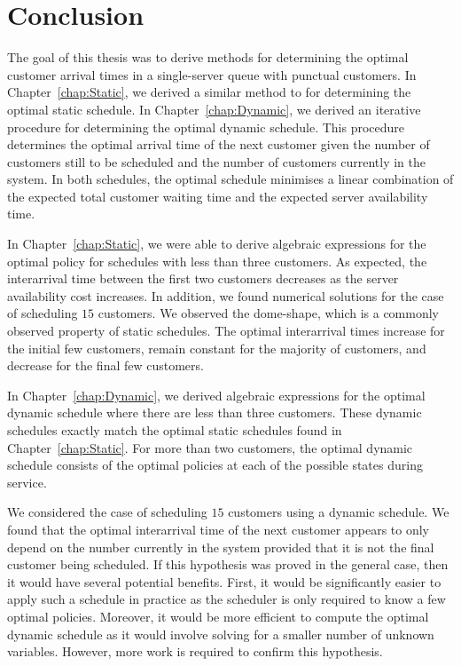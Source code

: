 \chapter{Conclusion}
The goal of this thesis was to derive methods for determining the optimal customer arrival times in a single-server queue with punctual customers. In Chapter~\ref{chap:Static}, we derived a similar method to \citet{Pegden} for determining the optimal static schedule. In Chapter~\ref{chap:Dynamic}, we derived an iterative procedure for determining the optimal dynamic schedule. This procedure determines the optimal arrival time of the next customer given the number of customers still to be scheduled and the number of customers currently in the system. In both schedules, the optimal schedule minimises a linear combination of the expected total customer waiting time and the expected server availability time.

In Chapter~\ref{chap:Static}, we were able to derive algebraic expressions for the optimal policy for schedules with less than three customers. As expected, the interarrival time between the first two customers decreases as the server availability cost increases. In addition, we found numerical solutions for the case of scheduling $15$ customers. We observed the dome-shape, which is a commonly observed property of static schedules. The optimal interarrival times increase for the initial few customers, remain constant for the majority of customers, and decrease for the final few customers.

In Chapter~\ref{chap:Dynamic}, we derived algebraic expressions for the optimal dynamic schedule where there are less than three customers. These dynamic schedules exactly match the optimal static schedules found in Chapter~\ref{chap:Static}. For more than two customers, the optimal dynamic schedule consists of the optimal policies at each of the possible states during service.

We considered the case of scheduling $15$ customers using a dynamic schedule. We found that the optimal interarrival time of the next customer appears to only depend on the number currently in the system provided that it is not the final customer being scheduled. If this hypothesis was proved in the general case, then it would have several potential benefits. First, it would be significantly easier to apply such a schedule in practice as the scheduler is only required to know a few optimal policies. Moreover, it would be more efficient to compute the optimal dynamic schedule as it would involve solving for a smaller number of unknown variables. However, more work is required to confirm this hypothesis.

